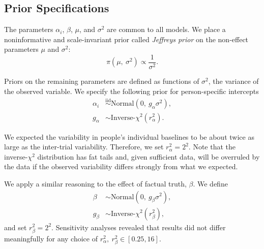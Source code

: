 \documentclass[
  english,
  ,man,floatsintext]{apa6}
\begin{document}
\begin{appendix}
\hypertarget{prior-specifications}{%
\section{Prior Specifications}\label{prior-specifications}}

\label{sec:priors}

The parameters \(\alpha_i\), \(\beta\), \(\mu\), and \(\sigma^2\) are
common to all models. We place a noninformative and scale-invariant
prior called \textit{Jeffreys prior} \autocite{jeffreys1961} on the
non-effect parameters \(\mu\) and \(\sigma^2\): \begin{equation}
\pi(\mu,\ \sigma^2) \propto \dfrac{1}{\sigma^2}.
\end{equation}

Priors on the remaining parameters are defined as functions of
\(\sigma^2\), the variance of the observed variable. We specify the
following prior for person-specific intercepts \begin{equation}
\begin{split}
\label{eq:prior_alpha}
\alpha_i &\overset{\text{iid}}{\sim} \text{Normal}(0,\ g_\alpha \sigma^2),\\
g_\alpha &\sim \text{Inverse-}\chi^2(r_\alpha^2).
\end{split}
\end{equation}

We expected the variability in people's individual baselines to be about
twice as large as the inter-trial variability. Therefore, we set
\(r_\alpha^2 = 2^2\). Note that the inverse-\(\chi^2\) distribution has
fat tails and, given sufficient data, will be overruled by the data if
the observed variability differs strongly from what we expected.

We apply a similar reasoning to the effect of factual truth, \(\beta\).
We define \begin{equation}
\begin{split}
\beta &\sim \text{Normal}(0,\ g_\beta \sigma^2),\\
g_\beta &\sim \text{Inverse-}\chi^2(r_\beta^2),
\end{split}
\end{equation} and set \(r_\beta^2 = 2^2\). Sensitivity analyses
revealed that results did not differ meaningfully for any choice of
\(r_\alpha^2,\ r_\beta^2 \in [0.25, 16]\).
\end{appendix}
\end{document}

